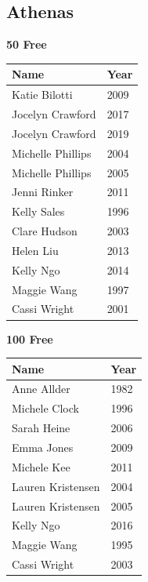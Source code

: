 \subsection{Athenas}
\vspace{1.2em}
\noindent\begin{minipage}[t]{0.48\textwidth}
\centering
\textbf{\textcolor{teamprimary}{50 Free}}\par
\vspace{0.5em}
\centering
\small
\renewcommand{\arraystretch}{1.0}
\setlength{\tabcolsep}{4pt}
\begin{tabular}{@{}p{3.0cm}p{1.0cm}@{}}
\toprule
\textbf{Name} & \textbf{Year} \\
\midrule
Katie Bilotti & 2009 \\
Jocelyn Crawford & 2017 \\
Jocelyn Crawford & 2019 \\
Michelle Phillips & 2004 \\
Michelle Phillips & 2005 \\
Jenni Rinker & 2011 \\
Kelly Sales & 1996 \\
Clare Hudson & 2003 \\
Helen Liu & 2013 \\
Kelly Ngo & 2014 \\
Maggie Wang & 1997 \\
Cassi Wright & 2001 \\
\bottomrule
\end{tabular}
\end{minipage}
\hfill
\begin{minipage}[t]{0.48\textwidth}
\centering
\textbf{\textcolor{teamprimary}{100 Free}}\par
\vspace{0.5em}
\centering
\small
\renewcommand{\arraystretch}{1.0}
\setlength{\tabcolsep}{4pt}
\begin{tabular}{@{}p{3.0cm}p{1.0cm}@{}}
\toprule
\textbf{Name} & \textbf{Year} \\
\midrule
Anne Allder & 1982 \\
Michele Clock & 1996 \\
Sarah Heine & 2006 \\
Emma Jones & 2009 \\
Michele Kee & 2011 \\
Lauren Kristensen & 2004 \\
Lauren Kristensen & 2005 \\
Kelly Ngo & 2016 \\
Maggie Wang & 1995 \\
Cassi Wright & 2003 \\
\bottomrule
\end{tabular}
\end{minipage}
